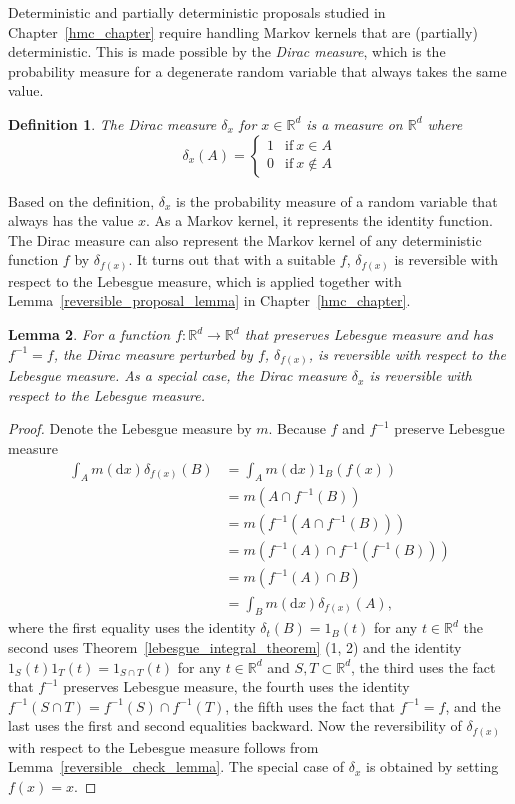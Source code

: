 \documentclass[english,twoside,openright]{HYgraduMLDS}
\newtheorem{lemma}{Lemma}[chapter]
\newtheorem{definition}[lemma]{Definition}
\newcommand{\R}{\mathbb{R}}
\newcommand{\dx}{\mathrm{d}}
\begin{document}
Deterministic and partially deterministic proposals studied in
Chapter~\ref{hmc_chapter} require handling Markov kernels that are (partially)
deterministic. This is made possible by the \emph{Dirac measure}, which is
the probability measure for a degenerate random variable that always takes
the same value.
\begin{definition}
	The Dirac measure \(\delta_{x}\) for \(x\in \R^{d}\) is a measure on \(\R^{d}\)
  where
  \[
    \delta_{x}(A) = \begin{cases}
      1 & \mathrm{if}\  x\in A\\
      0 & \mathrm{if}\  x\notin A
    \end{cases}
  \]
\end{definition}
Based on the definition, \(\delta_{x}\) is the probability measure of a random
variable that always has the value \(x\). As a Markov kernel, it represents
the identity function. The Dirac measure can also represent the Markov kernel
of any deterministic function \(f\) by \(\delta_{f(x)}\). It turns out that
with a suitable \(f\), \(\delta_{f(x)}\) is reversible with respect to the
Lebesgue measure, which is applied together with
Lemma~\ref{reversible_proposal_lemma} in Chapter~\ref{hmc_chapter}.

\begin{lemma}\label{dirac_measure_reversible_lemma}
  For a function \(f\colon \R^{d}\to \R^{d}\) that preserves Lebesgue measure and has
  \(f^{-1} = f\),
	the Dirac measure perturbed by \(f\), \(\delta_{f(x)}\), is reversible
  with respect to the Lebesgue measure. As a special case,
  the Dirac measure \(\delta_{x}\) is reversible with respect to the
  Lebesgue measure.
\end{lemma}
\begin{proof}
  Denote the Lebesgue measure by \(m\). Because \(f\) and \(f^{-1}\) preserve
  Lebesgue measure
	\begin{align*}
    \int_{A}m(\dx x)\delta_{f(x)}(B)
    &= \int_{A}m(\dx x)1_{B}(f(x))
    \\&= m(A\cap f^{-1}(B))
    \\&= m(f^{-1}(A\cap f^{-1}(B)))
    \\&= m(f^{-1}(A)\cap f^{-1}(f^{-1}(B)))
    \\&= m(f^{-1}(A)\cap B)
    \\&= \int_{B}m(\dx x)\delta_{f(x)}(A),
  \end{align*}
  where the first equality uses the identity \(\delta_{t}(B) = 1_{B}(t)\)
  for any \(t\in \R^{d}\) the second uses
  Theorem~\ref{lebesgue_integral_theorem} (1, 2) and the identity
  \(1_{S}(t)1_{T}(t) = 1_{S\cap T}(t)\) for any \(t\in \R^{d}\) and
  \(S, T\subset \R^{d}\),
  the third uses the fact that \(f^{-1}\) preserves Lebesgue measure,
  the fourth uses the identity \(f^{-1}(S\cap T) = f^{-1}(S)\cap f^{-1}(T)\),
  the fifth uses the fact that \(f^{-1} = f\), and the last uses
  the first and second equalities backward.
  Now the reversibility of \(\delta_{f(x)}\) with respect to the Lebesgue measure
  follows from Lemma~\ref{reversible_check_lemma}.
  The special case of \(\delta_{x}\) is obtained by setting \(f(x) = x\).
\end{proof}
\end{document}

